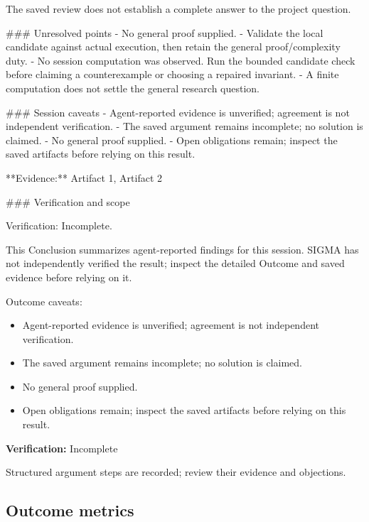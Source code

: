 \documentclass[11pt]{article}
\begin{document}
The saved review does not establish a complete answer to the project question.

\#\#\# Unresolved points
- No general proof supplied.
- Validate the local candidate against actual execution, then retain the general proof/complexity duty.
- No session computation was observed. Run the bounded candidate check before claiming a counterexample or choosing a repaired invariant.
- A finite computation does not settle the general research question.

\#\#\# Session caveats
- Agent-reported evidence is unverified; agreement is not independent verification.
- The saved argument remains incomplete; no solution is claimed.
- No general proof supplied.
- Open obligations remain; inspect the saved artifacts before relying on this result.

**Evidence:** Artifact 1, Artifact 2

\#\#\# Verification and scope

Verification: Incomplete.

This Conclusion summarizes agent-reported findings for this session. SIGMA has not independently verified the result; inspect the detailed Outcome and saved evidence before relying on it.\par
Outcome caveats:\par
\begin{itemize}
\item Agent-reported evidence is unverified; agreement is not independent verification.
\item The saved argument remains incomplete; no solution is claimed.
\item No general proof supplied.
\item Open obligations remain; inspect the saved artifacts before relying on this result.
\end{itemize}
\textbf{Verification:} Incomplete\par
Structured argument steps are recorded; review their evidence and objections.\par
\subsection{Outcome metrics}
\end{document}
